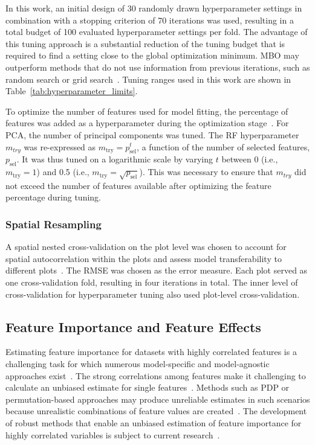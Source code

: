 \documentclass[remotesensing,article,accept,moreauthors,pdftex]{Definitions/mdpi}
\begin{document}
\begin{paracol}{2}
In this work, an initial design of 30 randomly drawn hyperparameter settings in combination with a stopping criterion of 70 iterations was used, resulting in a total budget of 100 evaluated hyperparameter settings per fold.
The advantage of this tuning approach is a substantial reduction of the tuning budget that is required to find a setting close to the global optimization minimum.
\ac{MBO} may outperform methods that do not use information from previous iterations, such as random search or grid search~\cite{bergstra2012}.
Tuning ranges used in this work are shown in Table~\ref{tab:hyperparameter_limits}.

To optimize the number of features used for model fitting, the percentage of features was added as a hyperparameter during the optimization stage~\cite{binder2020}.
For \ac{PCA}, the number of principal components was tuned.
The RF hyperparameter \texttt{\(m_{try}\)} was re-expressed as $m_\textrm{try} = p_\textrm{sel}^t$, a function of the number of selected features, $p_\textrm{sel}$.
It was thus tuned on a logarithmic scale by varying $t$ between 0 (i.e., $m_\textrm{try} = 1$) and 0.5 (i.e., $m_\textrm{try}=\sqrt{p_\textrm{sel}}$).
This was necessary to ensure that \texttt{\(m_{try}\)} did not exceed the number of features available after optimizing the feature percentage during tuning.

\subsubsection{Spatial Resampling}

A spatial nested cross-validation on the plot level was chosen to account for spatial autocorrelation within the plots and assess model transferability to different plots~\cite{schratz2019, sperrorest}.
The \ac{RMSE} was chosen as the error measure.
Each plot served as one cross-validation fold, resulting in four iterations in total.
The inner level of cross-validation for hyperparameter tuning also used plot-level cross-validation.

\subsection{Feature Importance and Feature Effects}

Estimating feature importance for datasets with highly correlated features is a challenging task for which numerous model-specific and model-agnostic approaches exist~\cite{friedman2001, hastie2001, greenwell2018}.
The strong correlations among features make it challenging to calculate an unbiased estimate for single features~\cite{molnar2019}.
Methods such as \ac{PDP} or permutation-based approaches may produce unreliable estimates in such scenarios because unrealistic combinations of feature values are created~\cite{molnar2019}.
The development of robust methods that enable an unbiased estimation of feature importance for highly correlated variables is subject to current research~\cite{brenning2021}.


\end{paracol}
\end{document}
